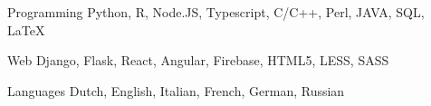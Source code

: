 

\begin{cvskills}

  \cvskill
    {Programming} %
    {Python, R, Node.JS, Typescript, C/C++, Perl, JAVA, SQL, LaTeX} %

  \cvskill
    {Web} %
    {Django, Flask, React, Angular, Firebase, HTML5, LESS, SASS} %

  \cvskill
    {Languages} %
    {Dutch, English, Italian, French, German, Russian} %

\end{cvskills}
